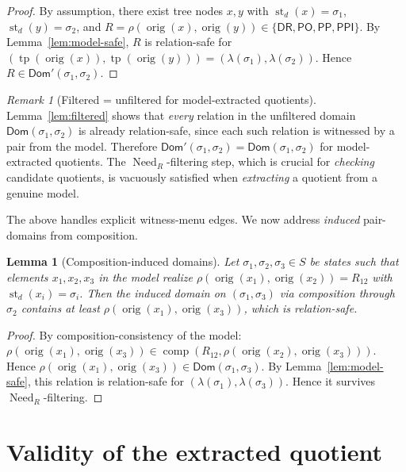 \documentclass[11pt]{article}
\newtheorem{lemma}[theorem]{Lemma}
\theoremstyle{definition}
\theoremstyle{remark}
\newtheorem{remark}[theorem]{Remark}
\newcommand{\DR}{\mathsf{DR}}
\newcommand{\PO}{\mathsf{PO}}
\newcommand{\PP}{\mathsf{PP}}
\newcommand{\PPI}{\mathsf{PPI}}
\newcommand{\RCC}{\{\DR,\PO,\PP,\PPI\}}
\newcommand{\tp}{\operatorname{tp}}
\newcommand{\st}{\operatorname{st}}
\newcommand{\comp}{\operatorname{comp}}
\newcommand{\orig}{\operatorname{orig}}
\newcommand{\Need}{\operatorname{Need}}
\newcommand{\Dom}{\mathsf{Dom}}
\begin{document}
\begin{proof}
By assumption, there exist tree nodes $x,y$ with
$\st_d(x)=\sigma_1$, $\st_d(y)=\sigma_2$, and
$R=\rho(\orig(x),\orig(y))\in\RCC$.
By Lemma~\ref{lem:model-safe}, $R$ is relation-safe for
$(\tp(\orig(x)),\tp(\orig(y)))=(\lambda(\sigma_1),\lambda(\sigma_2))$.
Hence $R\in\Dom'(\sigma_1,\sigma_2)$.
\end{proof}

\begin{remark}[Filtered = unfiltered for model-extracted quotients]
\label{rem:filtered-eq-unfiltered}
Lemma~\ref{lem:filtered} shows that \emph{every} relation in the
unfiltered domain $\Dom(\sigma_1,\sigma_2)$ is already
relation-safe, since each such relation is witnessed by a pair
from the model.  Therefore
$\Dom'(\sigma_1,\sigma_2)=\Dom(\sigma_1,\sigma_2)$ for
model-extracted quotients.  The $\Need_R$-filtering step, which is
crucial for \emph{checking} candidate quotients, is vacuously
satisfied when \emph{extracting} a quotient from a genuine model.
\end{remark}

The above handles explicit witness-menu edges.  We now address
\emph{induced} pair-domains from composition.

\begin{lemma}[Composition-induced domains]\label{lem:composition}
Let $\sigma_1,\sigma_2,\sigma_3\in S$ be states such that elements
$x_1,x_2,x_3$ in the model realize
$\rho(\orig(x_1),\orig(x_2))=R_{12}$ with $\st_d(x_i)=\sigma_i$.
Then the induced domain on $(\sigma_1,\sigma_3)$ via composition
through $\sigma_2$ contains at least $\rho(\orig(x_1),\orig(x_3))$,
which is relation-safe.
\end{lemma}

\begin{proof}
By composition-consistency of the model:
$\rho(\orig(x_1),\orig(x_3))\in\comp(R_{12},\rho(\orig(x_2),\orig(x_3)))$.
Hence
$\rho(\orig(x_1),\orig(x_3))\in\Dom(\sigma_1,\sigma_3)$.
By Lemma~\ref{lem:model-safe}, this relation is relation-safe for
$(\lambda(\sigma_1),\lambda(\sigma_3))$.
Hence it survives $\Need_R$-filtering.
\end{proof}


\section{Validity of the extracted quotient}
\label{sec:validity}
\end{document}
